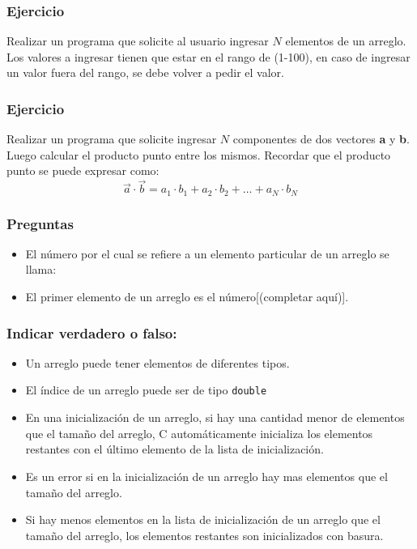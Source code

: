 \subsubsection{Ejercicio}
Realizar un programa que solicite al usuario ingresar $N$ elementos de un arreglo. Los valores a ingresar tienen que estar en el rango de (1-100), en caso de ingresar un valor fuera del rango, se debe volver a pedir el valor.
{\small
  \lstset{inputencoding=utf8/latin1}
  
}
\subsubsection{Ejercicio}
Realizar un programa que solicite ingresar $N$ componentes de dos vectores \textbf{a} y \textbf{b}. Luego calcular el producto punto entre los mismos.
Recordar que el producto punto se puede expresar como:
$$\overrightarrow{a}\cdot \overrightarrow{b} = a_1\cdot b_1 + a_2\cdot b_2 +\dots + a_N\cdot b_N$$
{\small
  \lstset{inputencoding=utf8/latin1}
  
}

\subsubsection{Preguntas} 
\begin{itemize}
  \item El número por el cual se refiere a un elemento particular de un arreglo se llama:
  \item El primer elemento de un arreglo es el número[(completar aquí)].
\end{itemize}

\subsubsection{Indicar verdadero o falso:}
\begin{itemize}
  \item Un arreglo puede tener elementos de diferentes tipos.
  \item El índice de un arreglo puede ser de tipo \texttt{double}
  \item En una inicialización de un arreglo, si hay una cantidad menor de elementos que el tamaño del arreglo, C automáticamente inicializa los elementos restantes con el último elemento de la lista de inicialización.
  \item Es un error si en la inicialización de un arreglo hay mas elementos que el tamaño del arreglo.
  \item Si hay menos elementos en la lista de inicialización de un arreglo que el tamaño del arreglo, los elementos restantes son inicializados con basura.
\end{itemize}

